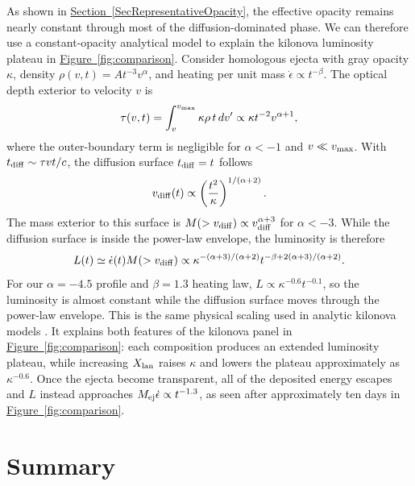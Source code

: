 \documentclass[final,5p,times,twocolumn]{elsarticle}
\DeclareRobustCommand{\secref}[1]{\hyperref[#1]{Section~\ref*{#1}}}
\DeclareRobustCommand{\figref}[1]{\hyperref[#1]{Figure~\ref*{#1}}}
\begin{document}
    As shown in \secref{SecRepresentativeOpacity}, the effective opacity remains nearly constant
    through most of the diffusion-dominated phase. We can therefore use a constant-opacity
    analytical model to explain the kilonova luminosity plateau in \figref{fig:comparison}.
    Consider homologous ejecta with gray opacity $\kappa$,
    density $\rho(v,t)=A t^{-3}v^\alpha$, and heating per unit mass
    $\dot{\epsilon}\propto t^{-\beta}$. The optical depth exterior to velocity $v$ is
    \begin{equation}
        \tau(v,t)=\int_v^{v_{\rm max}}\kappa\rho\,t\,dv'
        \propto \kappa t^{-2}v^{\alpha+1},
    \end{equation}
    where the outer-boundary term is negligible for $\alpha<-1$ and
    $v\ll v_{\rm max}$. With $t_{\rm diff}\sim\tau vt/c$, the diffusion surface
    $t_{\rm diff}=t$ follows
    \begin{equation}
        v_{\rm diff}(t)\propto
        \left(\frac{t^2}{\kappa}\right)^{1/(\alpha+2)}.
    \end{equation}
    The mass exterior to this surface is $M(>v_{\rm diff})\propto
    v_{\rm diff}^{\alpha+3}$ for $\alpha<-3$. While the diffusion surface is inside the
    power-law envelope, the luminosity is therefore
    \begin{equation}
        L(t)\simeq \dot{\epsilon}(t)M(>v_{\rm diff})
        \propto
        \kappa^{-(\alpha+3)/(\alpha+2)}
        t^{-\beta+2(\alpha+3)/(\alpha+2)} .
        \label{eq:kilonova_powerlaw}
    \end{equation}
    For our $\alpha=-4.5$ profile and $\beta=1.3$ heating law,
    $L\propto\kappa^{-0.6}t^{-0.1}$, so the luminosity is almost constant while the
    diffusion surface moves through the power-law envelope. This is the same physical scaling used
    in analytic kilonova models \cite{waxman2018constraints}. It explains both features of the
    kilonova panel in \figref{fig:comparison}: each composition produces an extended luminosity
    plateau, while increasing $X_{\rm lan}$ raises $\kappa$ and lowers the plateau approximately as
    $\kappa^{-0.6}$. Once the ejecta become transparent,
    all of the deposited energy escapes and $L$ instead approaches
    $M_{\rm ej}\dot{\epsilon}\propto t^{-1.3}$, as seen after approximately ten days in
    \figref{fig:comparison}.

   

\section{Summary}
\label{SecSummary}
\end{document}
